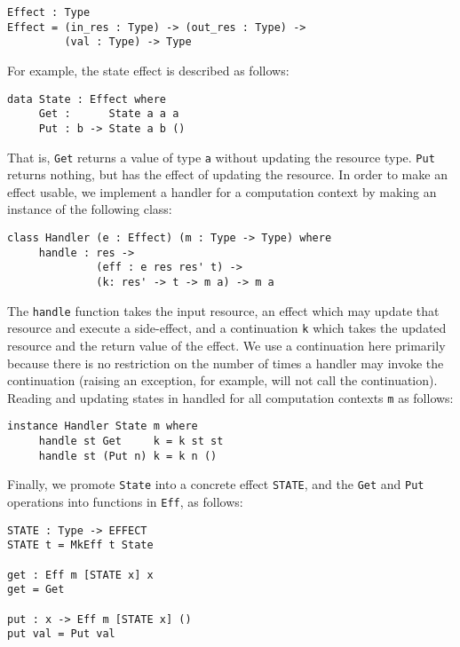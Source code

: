 \documentclass[preprint]{sigplanconf}
\begin{document}
\begin{Verbatim}
Effect : Type
Effect = (in_res : Type) -> (out_res : Type) -> 
         (val : Type) -> Type
\end{Verbatim}

For example, the state effect is described as follows:

\begin{Verbatim}
data State : Effect where
     Get :      State a a a
     Put : b -> State a b ()
\end{Verbatim}

That is, \texttt{Get} returns a value of type \texttt{a} without updating
the resource type. \texttt{Put} returns nothing, but has the effect of updating
the resource. In order to make an effect usable, we implement a handler
for a computation context by making an instance of the following class:

\begin{Verbatim}
class Handler (e : Effect) (m : Type -> Type) where
     handle : res -> 
              (eff : e res res' t) -> 
              (k: res' -> t -> m a) -> m a
\end{Verbatim}

The \texttt{handle} function takes the input resource, an effect which may
update that resource and execute a side-effect, and a continuation \texttt{k}
which takes the updated resource and the return value of the effect. We use
a continuation here primarily because there is no restriction on the number of
times a handler may invoke the continuation (raising an exception, for example,
will not call the continuation). Reading and updating states in handled
for all computation contexts \texttt{m} as follows:

\begin{Verbatim}
instance Handler State m where
     handle st Get     k = k st st
     handle st (Put n) k = k n ()
\end{Verbatim}

Finally, we promote \texttt{State} into a concrete effect \texttt{STATE}, and
the \texttt{Get} and \texttt{Put} operations into functions in \texttt{Eff}, as
follows:

\begin{Verbatim}
STATE : Type -> EFFECT
STATE t = MkEff t State

get : Eff m [STATE x] x
get = Get 

put : x -> Eff m [STATE x] ()
put val = Put val
\end{Verbatim}
\end{document}
